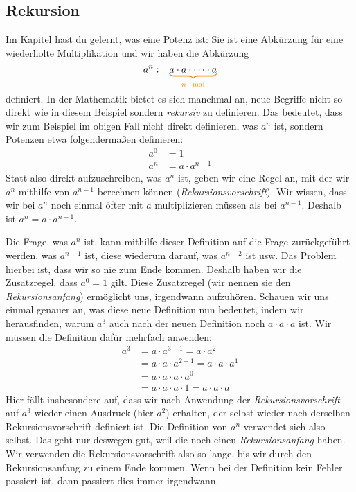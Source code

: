 \documentclass[../../main.tex]{subfiles}
\begin{document}
\subsection*{Rekursion}
Im Kapitel  hast du gelernt, was eine Potenz ist: Sie ist eine Abkürzung für eine wiederholte Multiplikation und wir haben die Abkürzung
\[a^n:=\colorbrace{a\cdot a\cdot \dots \cdot a}{n-\text{mal}}\]
definiert. In der Mathematik bietet es sich manchmal an, neue Begriffe nicht so direkt wie in diesem Beispiel sondern \emph{rekursiv} zu definieren. Das bedeutet, dass wir zum Beispiel im obigen Fall nicht direkt definieren, was $a^n$ ist, sondern Potenzen etwa folgendermaßen definieren:
\begin{align}
    a^0&=1\\
    a^n&=a\cdot a^{n-1}
\end{align}
Statt also direkt aufzuschreiben, was $a^n$ ist, geben wir eine Regel an, mit der wir $a^n$ mithilfe von $a^{n-1}$ berechnen können (\emph{Rekursionsvorschrift}). Wir wissen, dass wir bei $a^n$ noch einmal öfter mit $a$ multiplizieren müssen als bei $a^{n-1}$. Deshalb ist $a^n=a\cdot a^{n-1}$. 

Die Frage, was $a^n$ ist, kann mithilfe dieser Definition auf die Frage zurückgeführt werden, was $a^{n-1}$ ist, diese wiederum darauf, was $a^{n-2}$ ist usw. Das Problem hierbei ist, dass wir so nie zum Ende kommen. Deshalb haben wir die Zusatzregel, dass $a^0=1$ gilt. Diese Zusatzregel (wir nennen sie den \emph{Rekursionsanfang}) ermöglicht uns, irgendwann aufzuhören. Schauen wir uns einmal genauer an, was diese neue Definition nun bedeutet, indem wir herausfinden, warum $a^3$ auch nach der neuen Definition noch $a\cdot a\cdot a$ ist. Wir müssen die Definition dafür mehrfach anwenden:
\begin{align*}
    a^3&=a\cdot a^{3-1}=a\cdot a^2\\
    &=a\cdot a\cdot a^{2-1}=a\cdot a\cdot a^1\\
    &=a\cdot a\cdot a\cdot a^0\\
    &=a\cdot a\cdot a\cdot 1=a\cdot a\cdot a
\end{align*}
Hier fällt insbesondere auf, dass wir nach Anwendung der \emph{Rekursionsvorschrift} auf $a^3$ wieder einen Ausdruck (hier $a^2$) erhalten, der selbst wieder nach derselben Rekursionsvorschrift definiert ist. Die Definition von $a^n$ verwendet sich also selbst. Das geht nur deswegen gut, weil die noch einen \emph{Rekursionsanfang} haben. Wir verwenden die Rekursionsvorschrift also so lange, bis wir durch den Rekursionsanfang zu einem Ende kommen. Wenn bei der Definition kein Fehler passiert ist, dann passiert dies immer irgendwann.
\end{document}
